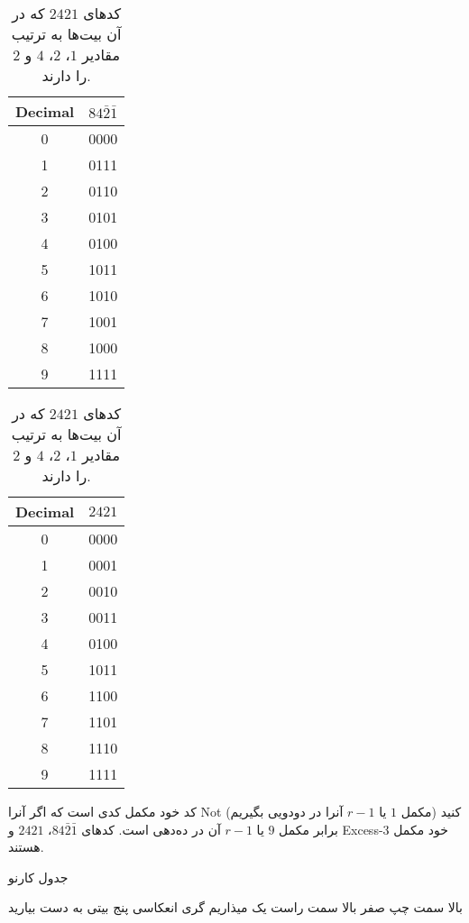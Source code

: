 \documentclass[a5paper]{article}
\begin{document}
\begin{table}[ht]
  \begin{minipage}[t]{.45\linewidth}\centering
    \begin{tabular}{c c}
      Decimal & $84\bar{2}\bar{1}$ \\
      \hline
      0 & 0000\\
      1 & 0111\\
      2 & 0110\\
      3 & 0101\\
      4 & 0100\\
      5 & 1011\\
      6 & 1010\\
      7 & 1001\\
      8 & 1000\\
      9 & 1111\\
    \end{tabular}
    \caption{کدهای $8 4 \bar{2} \bar{1}$ که در آن بیت‌ها به ترتیب مقادیر $-1$، $-2$، $4$ و $8$ را دارند.}
  \end{minipage}
  \hfill
  \begin{minipage}[t]{.45\linewidth}\centering
    \begin{tabular}{c c}
      Decimal & $2421$ \\
      \hline
      0 & 0000\\
      1 & 0001\\
      2 & 0010\\
      3 & 0011\\
      4 & 0100\\
      5 & 1011\\
      6 & 1100\\
      7 & 1101\\
      8 & 1110\\
      9 & 1111\\
    \end{tabular}
    \caption{کدهای $2 4 2 1$ که در آن بیت‌ها به ترتیب مقادیر $1$، $2$، $4$ و $2$ را دارند.}
  \end{minipage}
\end{table}

کد خود مکمل کدی است که اگر آنرا Not کنید (مکمل $1$ یا $r-1$ آنرا در دودویی بگیریم)
برابر مکمل $9$ یا $r-1$ آن در ده‌دهی است. کدهای $84\bar{2}\bar{1}$، $2421$ و Excess-3 خود مکمل هستند.




جدول کارنو

بالا سمت چپ صفر
بالا سمت راست یک میذاریم
گری انعکاسی پنج بیتی به دست بیارید
\end{document}
